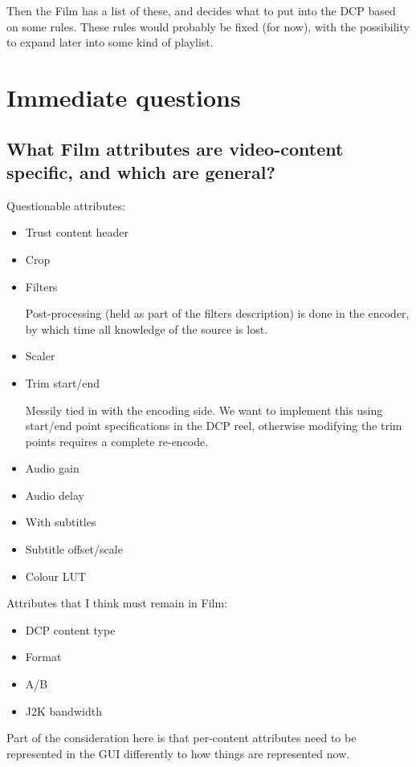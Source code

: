 \documentclass{article}
\begin{document}
Then the Film has a list of these, and decides what to put into the
DCP based on some rules.  These rules would probably be fixed (for
now), with the possibility to expand later into some kind of playlist.


\section{Immediate questions}

\subsection{What Film attributes are video-content specific, and which are general?}

Questionable attributes:

\begin{itemize}
\item Trust content header
\item Crop
\item Filters

Post-processing (held as part of the filters description) is done in
the encoder, by which time all knowledge of the source is lost.

\item Scaler
\item Trim start/end

Messily tied in with the encoding side.  We want to implement this
using start/end point specifications in the DCP reel, otherwise
modifying the trim points requires a complete re-encode.

\item Audio gain
\item Audio delay
\item With subtitles
\item Subtitle offset/scale
\item Colour LUT
\end{itemize}

Attributes that I think must remain in Film:
\begin{itemize}
\item DCP content type
\item Format
\item A/B
\item J2K bandwidth
\end{itemize}

Part of the consideration here is that per-content attributes need to
be represented in the GUI differently to how things are represented
now.
\end{document}
